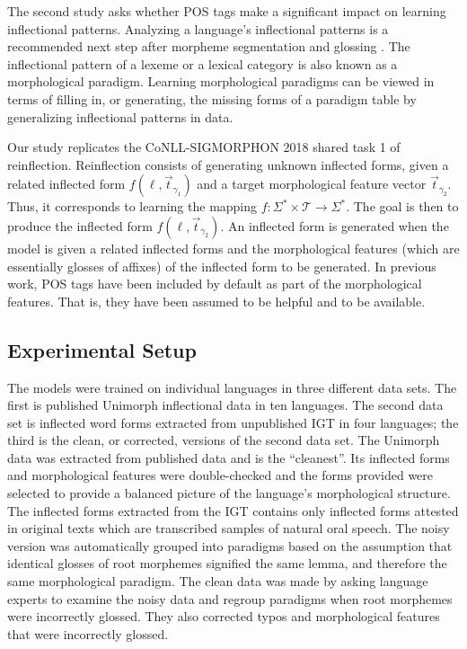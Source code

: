 The second study asks whether POS tags make a significant impact on learning inflectional patterns. Analyzing a language's inflectional patterns is a recommended next step after morpheme segmentation and glossing \citep{bird_machine_2012}. The inflectional pattern of a lexeme or a lexical category is also known as a morphological paradigm. Learning morphological paradigms can be viewed in terms of filling in, or generating, the missing forms of a paradigm table by generalizing inflectional patterns in data. 

Our study replicates the CoNLL-SIGMORPHON 2018 shared task 1 of reinflection. Reinflection consists of generating unknown inflected forms, given a related inflected form 
$f(\ell, \vec{t}_{\gamma_1})$ and a target morphological feature vector $\vec{t}_{\gamma_2}$. Thus, it corresponds to learning the mapping $f : \Sigma^* \times \mathcal{T} \to \Sigma^*$. The goal is then to produce the inflected form $f(\ell, \vec{t}_{\gamma_2})$. 
An inflected form is generated when the model is given a related inflected forms and the morphological features (which are essentially glosses of affixes) of the inflected form to be generated. 
In previous work, POS tags have been included by default as part of the morphological features. That is, they have been assumed to be helpful and to be available.


\subsection{Experimental Setup}
\label{sec:inflectionsetup}

The models were trained on individual languages in three different data sets. The first is published Unimorph inflectional data in ten languages. The second data set is inflected word forms extracted from unpublished IGT in four languages; the third is the clean, or corrected, versions of the second data set. 
The Unimorph data was extracted from published data and is the ``cleanest''. Its inflected forms and morphological features were double-checked and the forms provided were selected to provide a balanced picture of the language's morphological structure. The inflected forms extracted from the IGT contains only inflected forms attested in original texts which are transcribed samples of natural oral speech. The noisy version was automatically grouped into paradigms based on the assumption that identical glosses of root morphemes signified the same lemma, and therefore the same morphological paradigm. The clean data was made by asking language experts to examine the noisy data and regroup paradigms when root morphemes were incorrectly glossed. They also corrected typos and morphological features that were incorrectly glossed. 

